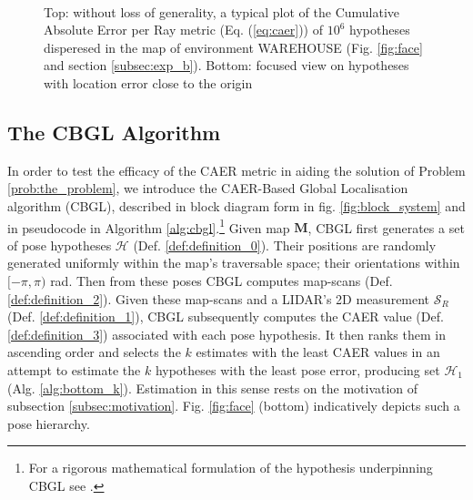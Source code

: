 \begin{figure}\vspace{-1.5cm}
  \subfloat{\hspace{0.5cm}}\vspace{-1.5cm}\\
  \subfloat{\hspace{-0.3cm}}
  \caption{\small Top: without loss of generality, a typical plot of the
           Cumulative Absolute Error per Ray metric (Eq. (\ref{eq:caer})) of
           $10^6$ hypotheses disperesed in the map of environment WAREHOUSE
           (Fig. \ref{fig:face} and section \ref{subsec:exp_b}). Bottom:
           focused view on hypotheses with location error close to the origin}
  \vspace{-0.5cm}
  \label{fig:motivation_caer}
\end{figure}

\subsection{The CBGL Algorithm}

In order to test the efficacy of the CAER metric in aiding the solution of
Problem \ref{prob:the_problem}, we introduce the CAER-Based Global Localisation
algorithm (CBGL), described in block diagram form in fig.
\ref{fig:block_system} and in pseudocode in Algorithm
\ref{alg:cbgl}.\footnote{For a rigorous mathematical formulation of the
hypothesis underpinning CBGL see \cite{cbglarxiv}.} Given map $\bm{M}$, CBGL
first generates a set of pose hypotheses $\mathcal{H}$ (Def.
\ref{def:definition_0}). Their positions are randomly generated uniformly
within the map's traversable space; their orientations within $[-\pi,\pi)$ rad.
Then from these poses CBGL computes map-scans (Def.  \ref{def:definition_2}).
Given these map-scans and a LIDAR's 2D measurement $\mathcal{S}_R$ (Def.
\ref{def:definition_1}), CBGL subsequently computes the CAER value (Def.
\ref{def:definition_3}) associated with each pose hypothesis.  It then ranks
them in ascending order and selects the $k$ estimates with the least CAER
values in an attempt to estimate the $k$ hypotheses with the least pose error,
producing set $\mathcal{H}_1$ (Alg. \ref{alg:bottom_k}). Estimation in this
sense rests on the motivation of subsection \ref{subsec:motivation}. Fig.
\ref{fig:face} (bottom) indicatively depicts such a pose hierarchy.

